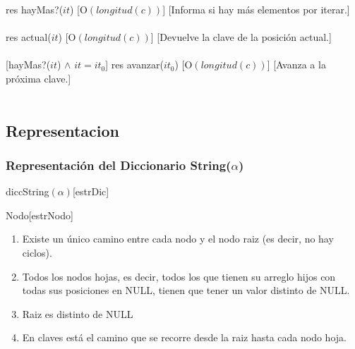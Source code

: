   {res \igobs hayMas?($it$)}%
  [O$(longitud(c))$] %
  [Informa si hay m\'as elementos por iterar.]\\\\

  {res \igobs actual($it$)}
  [O$(longitud(c))$]%
  [Devuelve la clave de la posici\'on actual.]\\\\

  [hayMas?($it$) $\land$ $it = it_{0}$] %
  {res \igobs avanzar($it_{0}$)}
  [O$(longitud(c))$]%
  [Avanza a la pr\'oxima clave.]\\\\


\subsection{Representacion}
  
  \subsubsection{Representaci\'on del Diccionario String($\alpha$)}
  \begin{Estructura}{diccString$(\alpha)$}[estrDic]
    \begin{Tupla}[estrDic]
    \end{Tupla}
\end{Estructura}

  \begin{Estructura}{Nodo}[estrNodo]
    \begin{Tupla}[estrNodo]
    \end{Tupla}
\end{Estructura}


\renewcommand{\labelenumi}{(\Roman{enumi})}
 \begin{enumerate}
 	\item Existe un \'unico camino entre cada nodo y el nodo raiz (es decir, no hay ciclos).
 	\item Todos los nodos hojas, es decir, todos los que tienen su arreglo hijos con todas sus posiciones en NULL, tienen que tener un valor distinto de NULL.
 	\item Raiz es distinto de NULL
 	\item En claves est\'a el camino que se recorre desde la raiz hasta cada nodo hoja.
  \end{enumerate}

